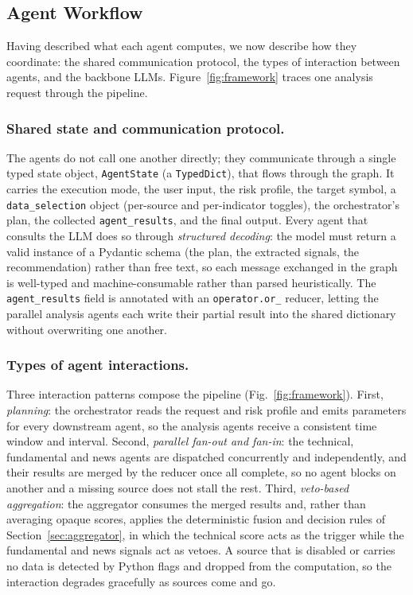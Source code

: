 \documentclass[runningheads]{llncs}
\begin{document}
\subsection{Agent Workflow}
\label{sec:workflow}

Having described what each agent computes, we now describe how they coordinate:
the shared communication protocol, the types of interaction between agents, and
the backbone LLMs. Figure~\ref{fig:framework} traces one analysis request through
the pipeline.

\subsubsection{Shared state and communication protocol.}
The agents do not call one another directly; they communicate through a single
typed state object, \texttt{AgentState} (a \texttt{TypedDict}), that flows through
the graph. It carries the execution mode, the user input, the risk profile, the
target symbol, a \texttt{data\_selection} object (per-source and per-indicator
toggles), the orchestrator's plan, the collected \texttt{agent\_results}, and the
final output. Every agent that consults the LLM does so through \emph{structured
decoding}: the model must return a valid instance of a Pydantic schema (the plan,
the extracted signals, the recommendation) rather than free text, so each message
exchanged in the graph is well-typed and machine-consumable rather than parsed
heuristically. The \texttt{agent\_results} field is annotated with an
\texttt{operator.or\_} reducer, letting the parallel analysis agents each write
their partial result into the shared dictionary without overwriting one another.

\subsubsection{Types of agent interactions.}
Three interaction patterns compose the pipeline (Fig.~\ref{fig:framework}). First,
\emph{planning}: the orchestrator reads the request and risk profile and emits
parameters for every downstream agent, so the analysis agents receive a consistent
time window and interval. Second, \emph{parallel fan-out and fan-in}: the
technical, fundamental and news agents are dispatched concurrently and
independently, and their results are merged by the reducer once all complete, so
no agent blocks on another and a missing source does not stall the rest. Third,
\emph{veto-based aggregation}: the aggregator consumes the merged results and,
rather than averaging opaque scores, applies the deterministic fusion and decision
rules of Section~\ref{sec:aggregator}, in which the technical score acts as the
trigger while the fundamental and news signals act as vetoes. A source that is
disabled or carries no data is detected by Python flags and dropped from the
computation, so the interaction degrades gracefully as sources come and go.
\end{document}
